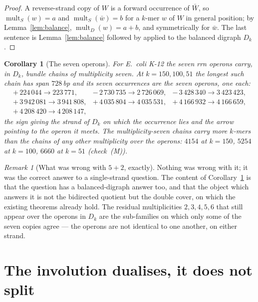 \documentclass[11pt]{article}
\theoremstyle{plain}
\newtheorem{corollary}[theorem]{Corollary}
\theoremstyle{definition}
\theoremstyle{remark}
\newtheorem{remark}[theorem]{Remark}
\newcommand{\mult}{\operatorname{mult}}
\begin{document}
\begin{proof}
A reverse-strand copy of $W$ is a forward occurrence of $\bar W$, so
$\mult_S(w)=a$ and $\mult_S(\bar w)=b$ for a $k$-mer $w$ of $W$ in general position; by
Lemma~\ref{lem:balance}, $\mult_D(w)=a+b$, and symmetrically for $\bar w$. The last
sentence is Lemma~\ref{lem:balance} followed by \cite[Lem.~2]{Bio3} applied to the
balanced digraph $D_k$.
\end{proof}

\begin{corollary}[The seven operons]\label{cor:rrna}
For \emph{E.\ coli} K-12 the seven \emph{rrn} operons carry, in $D_k$, bundle chains of
multiplicity seven. At $k=150,100,51$ the longest such chain has span $728$\,bp and its
seven occurrences are the seven operons, one each:
\[
\begin{array}{lll}
+\,224\,044\to223\,771, & -\,2\,730\,735\to2\,726\,069, & -\,3\,428\,340\to3\,423\,423,\\
+\,3\,942\,081\to3\,941\,808, & +\,4\,035\,804\to4\,035\,531, & +\,4\,166\,932\to4\,166\,659,\\
+\,4\,208\,420\to4\,208\,147, & &
\end{array}
\]
the sign giving the strand of $D_k$ on which the occurrence lies and the arrow pointing to
the operon it meets. The multiplicity-seven chains carry more $k$-mers than the chains of
any other multiplicity over the operons: $4154$ at $k=150$, $5254$ at $k=100$, $6660$ at
$k=51$ (check~(M)).
\end{corollary}

\begin{remark}[What was wrong with $5+2$, exactly]\label{rem:52}
Nothing was wrong with it; it was the correct answer to a single-strand question. The
content of Corollary~\ref{cor:rrna} is that the question has a balanced-digraph answer
too, and that the object which answers it is not the bidirected quotient but the double
cover, on which the existing theorems already hold. The residual multiplicities
$2,3,4,5,6$ that still appear over the operons in $D_k$ are the sub-families on which only
some of the seven copies agree --- the operons are not identical to one another, on either
strand.
\end{remark}

\section{The involution dualises, it does not split}\label{sec:rho}
\end{document}
